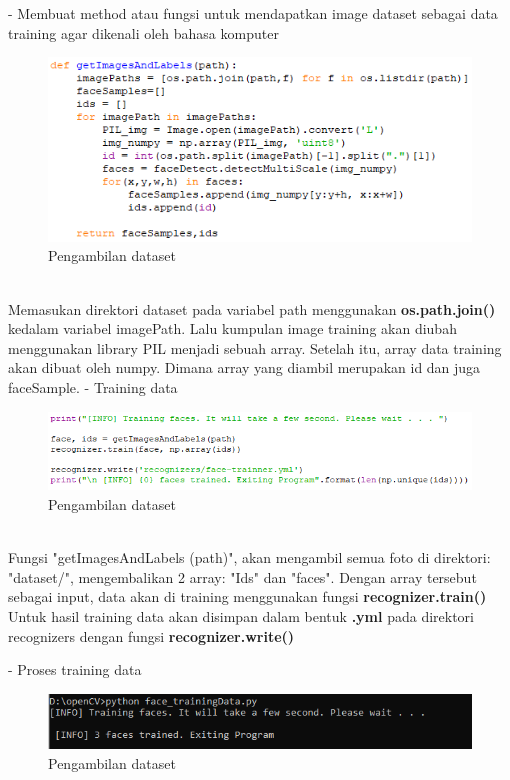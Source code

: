 \begin{enumerate}[1.]
- Membuat method atau fungsi untuk mendapatkan image dataset sebagai data training agar dikenali oleh bahasa komputer
\begin{figure}[h!]
    \centering
    \includegraphics[width=0.9\linewidth]{images/train_3.PNG}
    \caption{Pengambilan dataset}
\end{figure}\\
Memasukan direktori dataset pada variabel path menggunakan \textbf{os.path.join()} kedalam variabel imagePath.
Lalu kumpulan image training akan diubah menggunakan library PIL menjadi sebuah array. Setelah itu, array data training akan dibuat oleh numpy.
Dimana array yang diambil merupakan id dan juga faceSample.
\newpage
- Training data
\begin{figure}[h!]
    \centering
    \includegraphics[width=0.9\linewidth]{images/train_4.PNG}
    \caption{Pengambilan dataset}
\end{figure}\\
Fungsi "getImagesAndLabels (path)", akan mengambil semua foto di direktori: "dataset/", mengembalikan 2 array: "Ids" dan "faces". 
Dengan array tersebut sebagai input, data akan di training menggunakan fungsi \textbf{recognizer.train()}
Untuk hasil training data akan disimpan dalam bentuk \textbf{.yml} pada direktori recognizers dengan fungsi \textbf{recognizer.write()}

- Proses training data
\begin{figure}[h!]
    \centering
    \includegraphics[width=0.9\linewidth]{images/train_data.PNG}
    \caption{Pengambilan dataset}
\end{figure}


\end{enumerate}
